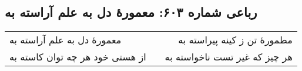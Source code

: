 \begin{center}
\section*{رباعی شماره ۶۰۳: معمورهٔ دل به علم آراسته به}
\label{sec:sh603}
\begin{longtable}{l p{0.5cm} r}
معمورهٔ دل به علم آراسته به
&&
مطمورهٔ تن ز کینه پیراسته به
\\
از هستی خود هر چه توان کاسته به
&&
هر چیز که غیر تست ناخواسته به
\\
\end{longtable}
\end{center}
